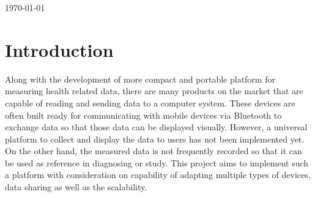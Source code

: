 \begin{titlepage}


{\large \today}\\[2cm] %



\vfill %

\end{titlepage}

\linespread{1.25}
\section{Introduction}
Along with the development of more compact and portable platform for measuring health related data, there are many
products on the market that are capable of reading and sending data to a computer system. These devices are often built
ready for communicating with mobile devices via Bluetooth to exchange data so that those data can be displayed visually.
However, a universal platform to collect and display the data to users has not been implemented yet. On the other hand,
the measured data is not frequently recorded so that it can be used as reference in diagnosing or study.  This project
aims to implement such a platform with consideration on capability of adapting multiple types of devices, data sharing
as well as the scalability.

